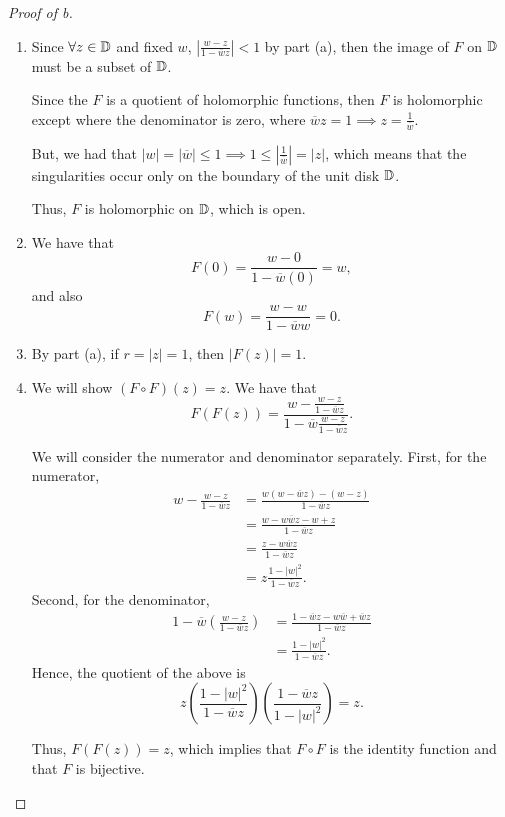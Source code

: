 \documentclass[../hw1]{subfiles}
\begin{document}
\begin{proof}[Proof of b]
	\begin{enumerate}[label=(\roman*)]
		\item Since $\forall z\in \mathbb{D}$ and fixed $w$,  $\left| \frac{w-z}{1-\overline{w}z} \right| <1$ by part (a),
		      then the image of $F$ on  $\mathbb{D}$ must be a subset of $\mathbb{D}$.

		      Since the $F$ is a quotient of holomorphic functions, then $F$ is holomorphic except where the denominator is zero, where $\overline{w}z=1 \implies z=\frac{1}{\overline{w}}$.

		      But, we had that $|w|=|\overline{w}|\le 1 \implies 1\le  \left| \frac{1}{\overline{w}} \right| = |z|$, which means that the singularities occur only on the boundary of the unit disk $\mathbb{D}$.

		      Thus, $F$ is holomorphic on $\mathbb{D}$, which is open.

		\item We have that \[
			      F(0)=\frac{w-0}{1-\overline{w}(0)}=w
			      ,\] and also \[
			      F(w)=\frac{w-w}{1-\overline{w}w}=0
			      .\]

		\item By part (a), if $r=|z|=1$, then  $|F(z)|=1$.
		\item We will show $(F\circ F)(z)=z$.
		      We have that \[
			      F(F(z)) = \frac{w-\frac{w-z}{1-\overline{w}z}}{1-\overline{w}\frac{w-z}{1-\overline{w}z}}
			      .\]

		      We will consider the numerator and denominator separately.
		      First, for the numerator,
		      \begin{align*}
			      w-\frac{w-z}{1-\overline{w}z} & = \frac{ w(w-\overline{w}z)-(w-z) }{1-\overline{w}z} \\
			                                    & = \frac{w-w\overline{w}z-w+z}{1-\overline{w}z}       \\
			                                    & = \frac{z-w\overline{w}z}{1-\overline{w}z}           \\
			                                    & = z\frac{1-|w|^2}{1-\overline{w}z}
			      .\end{align*}
		      Second, for the denominator,
		      \begin{align*}
			      1-\overline{w}\left( \frac{w-z}{1-\overline{w}z} \right) & = \frac{1-\overline{w}z-w\overline{w}+\overline{w}z}{1-\overline{w}z} \\
			                                                               & = \frac{1-|w|^2}{1-\overline{w}z}
			      .\end{align*}
		      Hence, the quotient of the above is \[
			      z\left( \frac{1-|w|^2}{1-\overline{w}z} \right) \left( \frac{1-\overline{w}z}{1-|w|^2} \right) = z
			      .\]

		      Thus, $F(F(z))=z$, which implies that $F \circ F$ is the identity function and that $F$ is bijective.
	\end{enumerate}
\end{proof}
\end{document}
